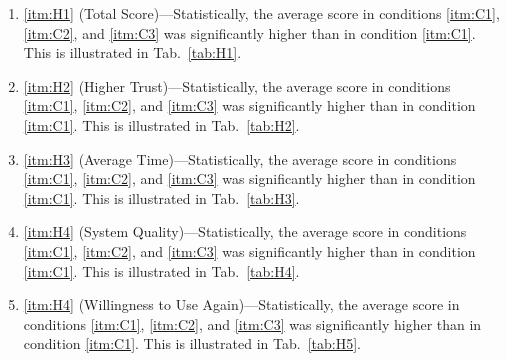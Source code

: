\begin{enumerate}
    \item \ref{itm:H1} (Total Score)---Statistically, the average score in conditions \ref{itm:C1}, \ref{itm:C2}, and \ref{itm:C3} was significantly higher than in condition \ref{itm:C1}. This is illustrated in Tab.~\ref{tab:H1}.
    \item \ref{itm:H2} (Higher Trust)---Statistically, the average score in conditions \ref{itm:C1}, \ref{itm:C2}, and \ref{itm:C3} was significantly higher than in condition \ref{itm:C1}. This is illustrated in Tab.~\ref{tab:H2}.
    \item \ref{itm:H3} (Average Time)---Statistically, the average score in conditions \ref{itm:C1}, \ref{itm:C2}, and \ref{itm:C3} was significantly higher than in condition \ref{itm:C1}. This is illustrated in Tab.~\ref{tab:H3}.
    \item \ref{itm:H4} (System Quality)---Statistically, the average score in conditions \ref{itm:C1}, \ref{itm:C2}, and \ref{itm:C3} was significantly higher than in condition \ref{itm:C1}. This is illustrated in Tab.~\ref{tab:H4}.
    \item \ref{itm:H4} (Willingness to Use Again)---Statistically, the average score in conditions \ref{itm:C1}, \ref{itm:C2}, and \ref{itm:C3} was significantly higher than in condition \ref{itm:C1}. This is illustrated in Tab.~\ref{tab:H5}.
\end{enumerate}
